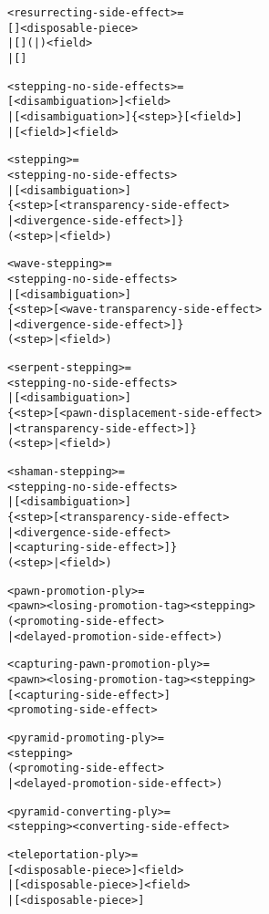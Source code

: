 \clearpage %

\begin{alltt}
<resurrecting-side-effect> =
  \alg{$}[\alg{$}]<disposable-piece>
| \alg{$}[\alg{$}](|)<field>
| [\alg{$$$}]

<stepping-no-side-effects> =
  [<disambiguation>]<field>
| [<disambiguation>]\{<step>\}[\alg{-}<field>]
| [<field>\alg{-}]<field>

<stepping> =
  <stepping-no-side-effects>
| [<disambiguation>]
  \{<step>[<transparency-side-effect>
          | <divergence-side-effect>]\}
  (<step> | \alg{-}<field>)

<wave-stepping> =
  <stepping-no-side-effects>
| [<disambiguation>]
  \{<step>[<wave-transparency-side-effect>
          | <divergence-side-effect>]\}
  (<step> | \alg{-}<field>)

<serpent-stepping> =
  <stepping-no-side-effects>
| [<disambiguation>]
  \{<step>[<pawn-displacement-side-effect>
          | <transparency-side-effect>]\}
  (<step> | \alg{-}<field>)

\end{alltt}

\clearpage %

\begin{alltt}
<shaman-stepping> =
  <stepping-no-side-effects>
| [<disambiguation>]
  \{<step>[<transparency-side-effect>
          | <divergence-side-effect>
          | <capturing-side-effect>]\}
  (<step> | \alg{-}<field>)

<pawn-promotion-ply> =
  <pawn><losing-promotion-tag><stepping>
  (<promoting-side-effect>
   | <delayed-promotion-side-effect>)

<capturing-pawn-promotion-ply> =
  <pawn><losing-promotion-tag><stepping>
  [<capturing-side-effect>]
  <promoting-side-effect>

<pyramid-promoting-ply> =
  <stepping>
  (<promoting-side-effect>
   | <delayed-promotion-side-effect>)

<pyramid-converting-ply> =
  <stepping><converting-side-effect>

<teleportation-ply> =
  \alg{|}[<disposable-piece>]<field>
| \alg{||}[<disposable-piece>]<field>
| \alg{|||}[<disposable-piece>]
\end{alltt}

\clearpage %

